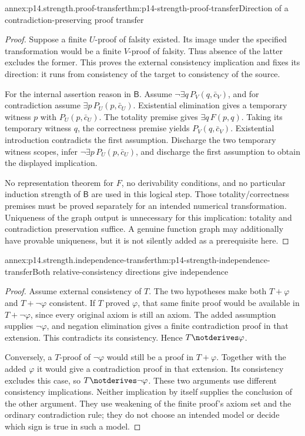 \begin{annexitem}{annex:p14.strength.proof-transfer}{thm:p14-strength-proof-transfer}{Direction of a contradiction-preserving proof transfer}
\begin{proof}
Suppose a finite \(U\)-proof of falsity existed. Its image under the
specified transformation would be a finite \(V\)-proof of falsity.
Thus absence of the latter excludes the former. This proves the
external consistency implication and fixes its direction: it runs
from consistency of the target to consistency of the source.

For the internal assertion reason in \(\mathsf B\). Assume
\(\neg\exists q\,P_V(q,\bar c_V)\), and for contradiction assume
\(\exists p\,P_U(p,\bar c_U)\). Existential elimination gives a
temporary witness \(p\) with \(P_U(p,\bar c_U)\). The totality
premise gives \(\exists q\,F(p,q)\). Taking its temporary witness
\(q\), the correctness premise yields \(P_V(q,\bar c_V)\).
Existential introduction contradicts the first assumption. Discharge
the two temporary witness scopes, infer
\(\neg\exists p\,P_U(p,\bar c_U)\), and discharge the first
assumption to obtain the displayed implication.

No representation theorem for \(F\), no derivability conditions,
and no particular induction strength of \(\mathsf B\) are used
in this logical step. Those totality/correctness premises must
be proved separately for an intended numerical transformation.
Uniqueness of the graph output is unnecessary for this implication:
totality and contradiction preservation suffice. A genuine function
graph may additionally have provable uniqueness, but it is not
silently added as a prerequisite here.
\end{proof}
\end{annexitem}

\begin{annexitem}{annex:p14.strength.independence-transfer}{thm:p14-strength-independence-transfer}{Both relative-consistency directions give independence}
\begin{proof}
Assume external consistency of \(T\). The two hypotheses make both
\(T+\varphi\) and \(T+\neg\varphi\) consistent.
If \(T\) proved \(\varphi\), that same finite proof would be
available in \(T+\neg\varphi\), since every original axiom is
still an axiom. The added assumption supplies \(\neg\varphi\),
and negation elimination gives a finite contradiction proof in
that extension. This contradicts its consistency. Hence
\(T\notderives\varphi\).

Conversely, a \(T\)-proof of \(\neg\varphi\) would still be
a proof in \(T+\varphi\). Together with the added \(\varphi\)
it would give a contradiction proof in that extension. Its
consistency excludes this case, so \(T\notderives\neg\varphi\).
These two arguments use different consistency implications.
Neither implication by itself supplies the conclusion of the
other argument. They use weakening of the finite proof's axiom
set and the ordinary contradiction rule; they do not choose an
intended model or decide which sign is true in such a model.
\end{proof}
\end{annexitem}
